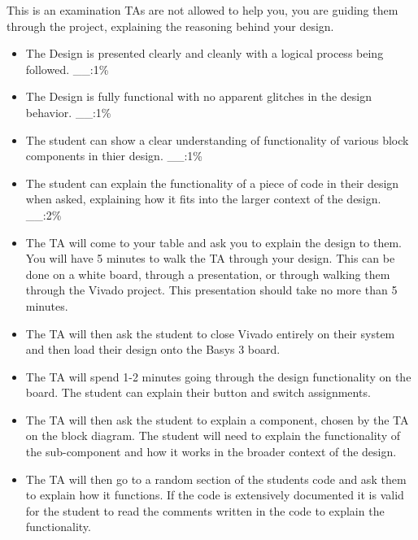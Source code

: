 This is an examination TAs are not allowed to help you, you are guiding them through the project, explaining the reasoning behind your design. 

\begin{itemize}
    \item The Design is presented clearly and cleanly with a logical process being followed. \hspace{1cm} \_\_:1\%
    \item The Design is fully functional with no apparent glitches in the design behavior. \hspace{1cm} \_\_:1\%
    \item The student can show a clear understanding of functionality of various block components in thier design. \hspace{1cm} \_\_:1\%
    \item The student can explain the functionality of a piece of code in their design when asked, explaining how it fits into the larger context of the design. \hspace{1cm} \_\_:2\%
\end{itemize}

\vspace{1cm}

\begin{itemize}
    \item The TA will come to your table and ask you to explain the design to them. You will have 5 minutes to walk the TA through your design. This can be done on a white board, through a presentation, or through walking them through the Vivado project. This presentation should take no more than 5 minutes.\\
    \item The TA will then ask the student to close Vivado entirely on their system and then load their design onto the Basys 3 board.
    \item The TA will spend 1-2 minutes going through the design functionality on the board. The student can explain their button and switch assignments.
    \item The TA will then ask the student to explain a component, chosen by the TA on the block diagram. The student will need to explain the functionality of the sub-component and how it works in the broader context of the design.
    \item The TA will then go to a random section of the students code and ask them to explain how it functions. If the code is extensively documented it is valid for the student to read the comments written in the code to explain the functionality. 
    
\end{itemize}

